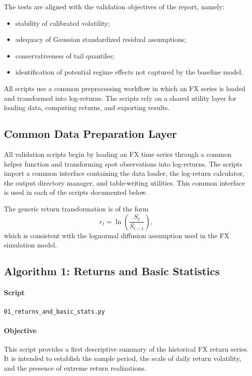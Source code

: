 	The tests are aligned with the validation objectives of the report, namely:
	\begin{itemize}
		\item stability of calibrated volatility;
		\item adequacy of Gaussian standardized residual assumptions;
		\item conservativeness of tail quantiles;
		\item identification of potential regime effects not captured by the baseline model.
	\end{itemize}
	
	All scripts use a common preprocessing workflow in which an FX series is loaded and transformed into log-returns. The scripts rely on a shared utility layer for loading data, computing returns, and exporting results.
	
	\subsection{Common Data Preparation Layer}
	
	All validation scripts begin by loading an FX time series through a common helper function and transforming spot observations into log-returns. The scripts import a common interface containing the data loader, the log-return calculator, the output directory manager, and table-writing utilities. This common interface is used in each of the scripts documented below.
	
	The generic return transformation is of the form
	\[
	r_t = \ln\left(\frac{S_t}{S_{t-1}}\right),
	\]
	which is consistent with the lognormal diffusion assumption used in the FX simulation model.
	
	\subsection{Algorithm 1: Returns and Basic Statistics}
	
	\paragraph{Script}
	\texttt{01\_returns\_and\_basic\_stats.py}
	
	\paragraph{Objective}
	This script provides a first descriptive summary of the historical FX return series. It is intended to establish the sample period, the scale of daily return volatility, and the presence of extreme return realizations.
	
